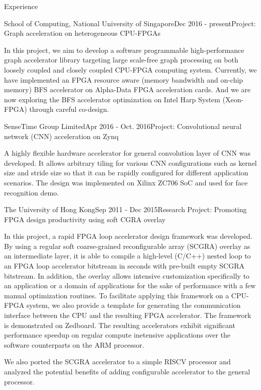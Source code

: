 \documentclass{resume} %
\begin{document}
\begin{rSection}{Experience}
\begin{rSubsection}{School of Computing, National University of Singapore}{Dec
    2016 - present}{Project: Graph acceleration on heterogeneous CPU-FPGAs}{}
\item In this project, we aim to develop a software programmable high-performance graph 
    accelerator library targeting large scale-free graph processing on both loosely coupled 
    and closely coupled CPU-FPGA computing system. Currently, we have implemented an FPGA 
    resource aware (memory bandwidth and on-chip memory) BFS accelerator 
    on Alpha-Data FPGA acceleration cards. And we are now exploring the BFS accelerator 
    optimization on Intel Harp System (Xeon-FPGA) through careful co-design.
\end{rSubsection}

\begin{rSubsection}{SenseTime Group Limited}{Apr 2016 - Oct. 2016}{Project: Convolutional neural network
    (CNN) acceleration on Zynq}{}
\item A highly flexible hardware accelerator for general convolution layer 
    of CNN was developed. It allows arbitrary tiling for various CNN configurations 
    such as kernel size and stride size so that it can be rapidly configured for different 
    application scenarios. The design was implemented on Xilinx ZC706 SoC and used 
    for face recognition demo.
\end{rSubsection}

\begin{rSubsection}{The University of Hong Kong}{Sep 2011 - Dec 2015}{Research Project: Promoting FPGA design productivity using soft CGRA overlay}{}
\item In this project, a rapid FPGA loop accelerator design framework was developed. By using a
    regular soft coarse-grained reconfigurable array (SCGRA) overlay as an intermediate layer, it is
    able to compile a high-level (C/C++) nested loop to an FPGA loop accelerator bitstream in
    seconds with pre-built empty SCGRA bitstream. In addition, the overlay allows intensive customization 
    specifically to an application or a domain of applications for the sake of performance with 
    a few manual optimization routines. To facilitate applying this framework on a CPU-FPGA system,
    we also provide a template for generating the communication interface between the CPU and 
    the resulting FPGA accelerator. The framework is demonstrated on Zedboard. The resulting 
    accelerators exhibit significant performance speedup on regular 
    compute inetensive applications over the software counterparts on the ARM processor. 
\\
\item We also ported the SCGRA accelerator to a simple RISCV processor 
    and analyzed the potential benefits of adding configurable accelerator 
    to the general processor.
\end{rSubsection}


\end{rSection}
\end{document}
